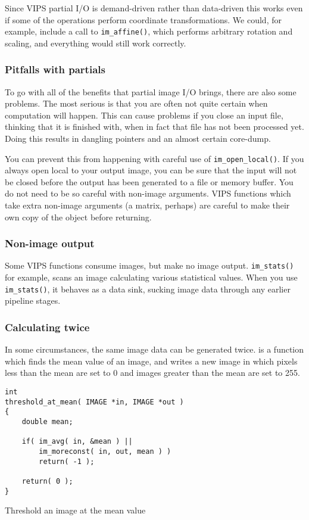 Since VIPS partial I/O is demand-driven rather than data-driven this works
even if some of the operations perform coordinate transformations.  We could,
for example, include a call to \verb+im_affine()+, which performs
arbitrary rotation and scaling, and everything would still work correctly.

\subsubsection{Pitfalls with partials}

To go with all of the benefits that partial image I/O brings, there are
also some problems. The most serious is that you are often not quite certain
when computation will happen. This can cause problems if you close an input
file, thinking that it is finished with, when in fact that file has not
been processed yet.  Doing this results in dangling pointers and an almost
certain core-dump.

You can prevent this from happening with careful use of
\verb+im_open_local()+.  If you always open local to your output image,
you can be sure that the input will not be closed before the output has been
generated to a file or memory buffer.  You do not need to be so careful with
non-image arguments. VIPS functions which take extra non-image arguments
(a matrix, perhaps) are careful to make their own copy of the object before
returning.

\subsubsection{Non-image output}

Some VIPS functions consume images, but make no image
output. \verb+im_stats()+ for example, scans an image calculating various
statistical values. When you use \verb+im_stats()+, it behaves as a data
sink, sucking image data through any earlier pipeline stages.

\subsubsection{Calculating twice}

In some circumstances, the same image data can be generated twice.
 is a function which finds the mean value of an
image, and writes a new image in which pixels less than the mean are set to
0 and images greater than the mean are set to 255.

\begin{fig2}
\begin{verbatim}
int
threshold_at_mean( IMAGE *in, IMAGE *out )
{
    double mean;

    if( im_avg( in, &mean ) ||
        im_moreconst( in, out, mean ) )
        return( -1 );

    return( 0 );
}
\end{verbatim}
\caption{Threshold an image at the mean value}
\label{fg:thrmean}
\end{fig2}

